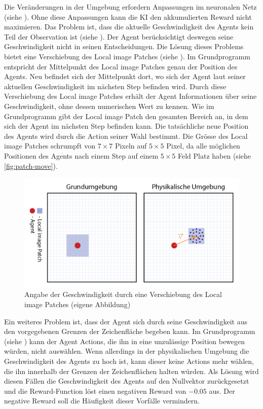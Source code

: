  
Die Veränderungen in der Umgebung erfordern Anpassungen im neuronalen Netz
(siehe ). Ohne diese Anpassungen kann die KI den
akkumulierten Reward nicht maximieren. Das Problem ist, dass die aktuelle
Geschwindigkeit des Agents kein Teil der Observation ist (siehe
). Der Agent berücksichtigt deswegen seine
Geschwindigkeit nicht in seinen Entscheidungen. Die Lösung dieses Problems
bietet eine Verschiebung des Local image Patches (siehe ).
Im Grundprogramm entspricht der Mittelpunkt des Local image Patches genau der
Position des Agents. Neu befindet sich der Mittelpunkt dort, wo sich der Agent
laut seiner aktuellen Geschwindigkeit im nächsten Step befinden wird. Durch
diese Verschiebung des Local image Patches erhält der Agent Informationen über
seine Geschwindigkeit, ohne dessen numerischen Wert zu kennen. Wie im
Grundprogramm gibt der Local image Patch den gesamten Bereich an, in dem sich
der Agent im nächsten Step befinden kann. Die tatsächliche neue Position des
Agents wird durch die Action seiner Wahl bestimmt. Die Grösse des Local image
Patches schrumpft von $7\times7$ Pixeln auf $5\times5$ Pixel, da alle möglichen
Positionen des Agents nach einem Step auf einem $5\times5$ Feld Platz haben
(siehe \autoref{fig:patch-move}).
 
\begin{figure}[!ht]
 \centering
 \includegraphics[width=\textwidth]{images/methode/patch-move.png}
 \caption{Angabe der Geschwindigkeit durch eine Verschiebung des Local image Patches (eigene Abbildung)}\label{fig:patch-move}
\end{figure}
 
 
Ein weiteres Problem ist, dass der Agent sich durch seine Geschwindigkeit aus
den vorgegebenen Grenzen der Zeichenfläche begeben kann. Im Grundprogramm 
(siehe ) kann der Agent Actions, die ihn in eine
unzulässige Position bewegen würden, nicht auswählen. Wenn allerdings in der
physikalischen Umgebung die Geschwindigkeit des Agents zu hoch ist, kann dieser
keine Actions mehr wählen, die ihn innerhalb der Grenzen der Zeichenflächen
halten würden. Als Lösung wird diesen Fällen die Geschwindigkeit des Agents auf den
Nullvektor zurückgesetzt und die Reward-Function löst einen negativen Reward von
$-0.05$ aus. Der negative Reward soll die Häufigkeit dieser Vorfälle vermindern.
 
